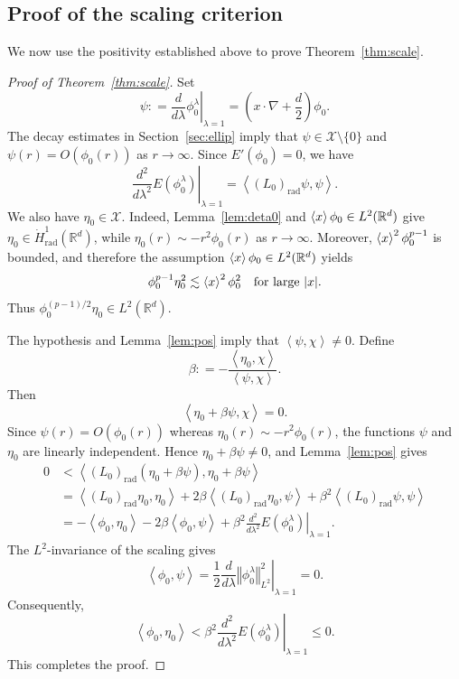 \documentclass[12pt, a4paper, reqno]{amsart}
\numberwithin{equation}{section}
\theoremstyle{definition}
\theoremstyle{remark}
\newcommand{\R}{\mathbb R}
\newcommand{\scX}{\mathscr X}
\def\tbra[#1,#2]{{\left\langle #1,#2\right\rangle}}
\def\norm[#1]{{\left\Vert #1 \right\Vert}}
\newcommand{\rad}{\mathrm{rad}}
\newcommand{\ce}{\mathrel{\mathop:}=}
\begin{document}
\subsection{Proof of the scaling criterion}

We now use the positivity established above to prove Theorem~\ref{thm:scale}.

\begin{proof}[Proof of Theorem~\ref{thm:scale}]
Set
\[
  \psi
  \ce\left.\frac{d}{d\lambda}\phi_0^\lambda\right|_{\lambda=1}
  =\left(x\cdot\nabla+\frac d2\right)\phi_0.
\]
The decay estimates in Section~\ref{sec:ellip} imply that $\psi\in \scX\setminus\{0\}$ and
$\psi(r)=O(\phi_0(r))$ as $r\to\infty$. Since $E'(\phi_0)=0$, we have
\[
  \left.\frac{d^2}{d\lambda^2}E(\phi_0^\lambda)\right|_{\lambda=1}
  =\tbra[(L_0)_{\rad}\psi,\psi].
\]
We also have $\eta_0\in \scX$. Indeed, Lemma~\ref{lem:deta0} and
$\braket{x}\phi_0\in L^2(\R^d)$ give
$\eta_0\in\dot H^1_{\rad}(\R^d)$, while
$\eta_0(r)\sim-r^2\phi_0(r)$ as $r\to\infty$. Moreover,
$\braket{x}^2\phi_0^{p-1}$ is bounded, and therefore the assumption
$\braket{x}\phi_0\in L^2(\R^d)$ yields
\[
  \phi_0^{p-1}\eta_0^2
  \lesssim
  \braket{x}^2\phi_0^2
  \quad\text{for large }|x|.
\]
Thus $\phi_0^{(p-1)/2}\eta_0\in L^2(\R^d)$.

The hypothesis and Lemma~\ref{lem:pos} imply that
$\tbra[\psi,\chi]\ne0$. Define
\[
  \beta
  \ce-\frac{\tbra[\eta_0,\chi]}{\tbra[\psi,\chi]}.
\]
Then
\[
  \tbra[\eta_0+\beta\psi,\chi]=0.
\]
Since $\psi(r)=O(\phi_0(r))$ whereas
$\eta_0(r)\sim-r^2\phi_0(r)$, the functions $\psi$ and $\eta_0$ are
linearly independent. Hence $\eta_0+\beta\psi\ne0$, and
Lemma~\ref{lem:pos} gives
\begin{align*}
  0
  &<\tbra[
    (L_0)_{\rad}(\eta_0+\beta\psi),
    \eta_0+\beta\psi
  ]
  \\
  &=\tbra[(L_0)_{\rad}\eta_0,\eta_0]
    +2\beta\tbra[(L_0)_{\rad}\eta_0,\psi]
    +\beta^2\tbra[(L_0)_{\rad}\psi,\psi]
  \\
  &=-\tbra[\phi_0,\eta_0]
    -2\beta\tbra[\phi_0,\psi]
    +\beta^2
      \left.\frac{d^2}{d\lambda^2}E(\phi_0^\lambda)\right|_{\lambda=1}.
\end{align*}
The $L^2$-invariance of the scaling gives
\[
  \tbra[\phi_0,\psi]
  =\left.
    \frac12\frac{d}{d\lambda}
    \norm[\phi_0^\lambda]_{L^2}^2
  \right|_{\lambda=1}
  =0.
\]
Consequently,
\[
  \tbra[\phi_0,\eta_0]
  <\beta^2
    \left.\frac{d^2}{d\lambda^2}E(\phi_0^\lambda)\right|_{\lambda=1}
  \le0.
\]
This completes the proof.
\end{proof}
\end{document}
